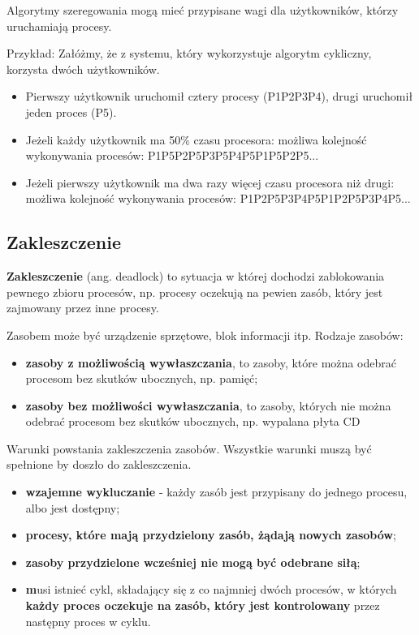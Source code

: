 \documentclass{article}
\begin{document}
Algorytmy szeregowania mogą mieć przypisane wagi dla użytkowników,
którzy uruchamiają procesy.

Przykład:
Załóżmy, że z systemu, który wykorzystuje algorytm cykliczny, korzysta dwóch użytkowników. 
\begin{itemize}
    \item Pierwszy użytkownik uruchomił cztery procesy (P1P2P3P4), drugi uruchomił jeden proces (P5). 
    \item Jeżeli każdy użytkownik ma 50\% czasu procesora: możliwa kolejność wykonywania procesów: P1P5P2P5P3P5P4P5P1P5P2P5... 
    \item Jeżeli pierwszy użytkownik ma dwa razy więcej czasu procesora niż drugi: możliwa kolejność wykonywania procesów: P1P2P5P3P4P5P1P2P5P3P4P5...
\end{itemize}

\subsection{Zakleszczenie}
\textbf{Zakleszczenie} (ang. deadlock) to sytuacja w której dochodzi zablokowania pewnego zbioru procesów, np. procesy oczekują na pewien zasób, który jest zajmowany przez inne procesy.

Zasobem może być urządzenie sprzętowe, blok informacji itp.
Rodzaje zasobów:
\begin{itemize}
\item \textbf{zasoby z możliwością wywłaszczania}, to zasoby, które można odebrać procesom bez skutków ubocznych, np. pamięć;
\item \textbf{zasoby bez możliwości wywłaszczania}, to zasoby, których nie można odebrać procesom bez skutków ubocznych, np. wypalana płyta CD
\end{itemize}

Warunki powstania zakleszczenia zasobów. Wszystkie warunki muszą być spełnione by doszło do zakleszczenia.
\begin{itemize}
    \item \textbf{wzajemne wykluczanie} - każdy zasób jest przypisany do jednego procesu, albo jest dostępny;
    \item \textbf{procesy, które mają przydzielony zasób, żądają nowych zasobów};
    \item \textbf{zasoby przydzielone wcześniej nie mogą być odebrane siłą};
    \item \textbf musi istnieć cykl, składający się z co najmniej dwóch procesów, w których \textbf{każdy proces oczekuje na zasób, który jest kontrolowany} przez następny proces w cyklu.
\end{itemize}
\end{document}
